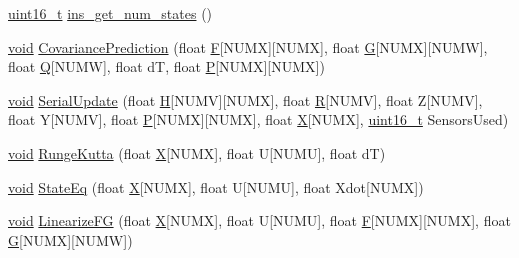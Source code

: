 \begin{DoxyCompactItemize}
\item 
\hyperlink{stdint_8h_a273cf69d639a59973b6019625df33e30}{uint16\-\_\-t} \hyperlink{group___i_n_s_g_p_s_ga62f40f528dea50baf8d414d1f55469af}{ins\-\_\-get\-\_\-num\-\_\-states} ()
\item 
\hyperlink{group___n_a_m_e_ga18028b8badbf1ea7e704ccac3c488e82}{void} \hyperlink{group___i_n_s_g_p_s_gae334cafbf8ace344247144c445997674}{Covariance\-Prediction} (float \hyperlink{group___i_n_s_g_p_s_ga8df5a9c6b80931e9a78e1ce3aa7fc8d7}{F}\mbox{[}N\-U\-M\-X\mbox{]}\mbox{[}N\-U\-M\-X\mbox{]}, float \hyperlink{group___i_n_s_g_p_s_ga728acb2fd56f38a4cab69ede7b3a027e}{G}\mbox{[}N\-U\-M\-X\mbox{]}\mbox{[}N\-U\-M\-W\mbox{]}, float \hyperlink{group___i_n_s_g_p_s_ga9403e530c40ea2ed78fba00336d98645}{Q}\mbox{[}N\-U\-M\-W\mbox{]}, float d\-T, float \hyperlink{group___i_n_s_g_p_s_gaa4dd4832559078fffbbe0afa316c216c}{P}\mbox{[}N\-U\-M\-X\mbox{]}\mbox{[}N\-U\-M\-X\mbox{]})
\item 
\hyperlink{group___n_a_m_e_ga18028b8badbf1ea7e704ccac3c488e82}{void} \hyperlink{group___i_n_s_g_p_s_ga4ae89830422fa564e86fd0fc2aa6267a}{Serial\-Update} (float \hyperlink{group___i_n_s_g_p_s_ga4080397a0d248e4c99d6f284b187f206}{H}\mbox{[}N\-U\-M\-V\mbox{]}\mbox{[}N\-U\-M\-X\mbox{]}, float \hyperlink{group___i_n_s_g_p_s_ga06fb8e491fbcc3c8cbe00ccaa0aa1aa7}{R}\mbox{[}N\-U\-M\-V\mbox{]}, float Z\mbox{[}N\-U\-M\-V\mbox{]}, float Y\mbox{[}N\-U\-M\-V\mbox{]}, float \hyperlink{group___i_n_s_g_p_s_gaa4dd4832559078fffbbe0afa316c216c}{P}\mbox{[}N\-U\-M\-X\mbox{]}\mbox{[}N\-U\-M\-X\mbox{]}, float \hyperlink{group___i_n_s_g_p_s_ga878335db1805364cefebddb5eccfc282}{X}\mbox{[}N\-U\-M\-X\mbox{]}, \hyperlink{stdint_8h_a273cf69d639a59973b6019625df33e30}{uint16\-\_\-t} Sensors\-Used)
\item 
\hyperlink{group___n_a_m_e_ga18028b8badbf1ea7e704ccac3c488e82}{void} \hyperlink{group___i_n_s_g_p_s_gac5eaabdd6d05ef0667c934d4ef59eafa}{Runge\-Kutta} (float \hyperlink{group___i_n_s_g_p_s_ga878335db1805364cefebddb5eccfc282}{X}\mbox{[}N\-U\-M\-X\mbox{]}, float U\mbox{[}N\-U\-M\-U\mbox{]}, float d\-T)
\item 
\hyperlink{group___n_a_m_e_ga18028b8badbf1ea7e704ccac3c488e82}{void} \hyperlink{group___i_n_s_g_p_s_ga48e6b0dab3d99bfc5cef7b24b773f533}{State\-Eq} (float \hyperlink{group___i_n_s_g_p_s_ga878335db1805364cefebddb5eccfc282}{X}\mbox{[}N\-U\-M\-X\mbox{]}, float U\mbox{[}N\-U\-M\-U\mbox{]}, float Xdot\mbox{[}N\-U\-M\-X\mbox{]})
\item 
\hyperlink{group___n_a_m_e_ga18028b8badbf1ea7e704ccac3c488e82}{void} \hyperlink{group___i_n_s_g_p_s_gab560144e7b798db7faf80a4c37902c88}{Linearize\-F\-G} (float \hyperlink{group___i_n_s_g_p_s_ga878335db1805364cefebddb5eccfc282}{X}\mbox{[}N\-U\-M\-X\mbox{]}, float U\mbox{[}N\-U\-M\-U\mbox{]}, float \hyperlink{group___i_n_s_g_p_s_ga8df5a9c6b80931e9a78e1ce3aa7fc8d7}{F}\mbox{[}N\-U\-M\-X\mbox{]}\mbox{[}N\-U\-M\-X\mbox{]}, float \hyperlink{group___i_n_s_g_p_s_ga728acb2fd56f38a4cab69ede7b3a027e}{G}\mbox{[}N\-U\-M\-X\mbox{]}\mbox{[}N\-U\-M\-W\mbox{]})

\end{DoxyCompactItemize}

